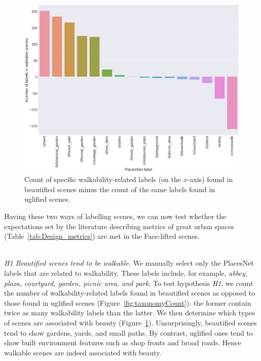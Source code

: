 \begin{figure}[h]
    \centering
    \includegraphics[width=\columnwidth]{walkable_taxonomy.png}
    \caption{Count of specific walkability-related labels  (on the $x$-axis) found in beautified scenes minus the count of the same labels found in uglified scenes.}
    \label{fig:WalkableTnomy}
\end{figure}


Having these two ways of labelling scenes, we can now test whether the expectations set by the literature describing metrics of great urban spaces (Table~\ref{tab:Design_metrics}) are  met in the Face-lifted scenes. 


\mbox{ } \\
\noindent
\emph{H1 Beautified scenes tend to be walkable.}
We manually select only the PlacesNet labels that are related to walkability. These labels include, for example, \textit{abbey, plaza, courtyard, garden, picnic area, \textrm{and} park}. To test hypothesis \emph{H1}, we count the number of walkability-related labels found in beautified scenes as opposed to those found in uglified scenes (Figure~\ref{fig:taxonomyCount}): the former contain twice as many walkability labels than the latter. We then determine which types of scenes are associated with beauty (Figure~\ref{fig:WalkableTnomy}). Unsurprisingly, beautified scenes tend to show gardens, yards, and small paths. By contrast, uglified ones tend to show built environment features such as shop fronts and broad roads. Hence walkable scenes are indeed associated with beauty.


